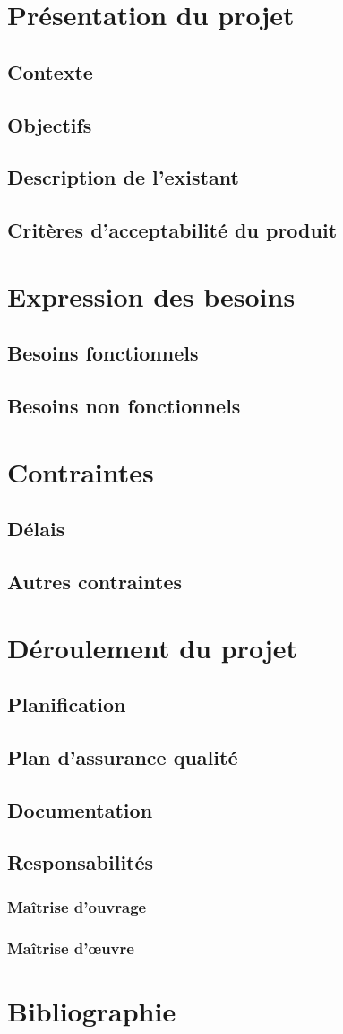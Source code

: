 \documentclass[12pt]{article}
\begin{document}
\newpage

\section{Présentation du projet}
\subsection{Contexte}
\subsection{Objectifs}
\subsection{Description de l'existant}
\subsection{Critères d'acceptabilité du produit}
\section{Expression des besoins}
\subsection{Besoins fonctionnels}
\subsection{Besoins non fonctionnels}
\section{Contraintes}
\subsection{Délais}
\subsection{Autres contraintes}
\section{Déroulement du projet}
\subsection{Planification}
\subsection{Plan d'assurance qualité}
\subsection{Documentation}
\subsection{Responsabilités}
\subsubsection{Maîtrise d'ouvrage}
\subsubsection{Maîtrise d’œuvre}
\section{Bibliographie}
\end{document}
